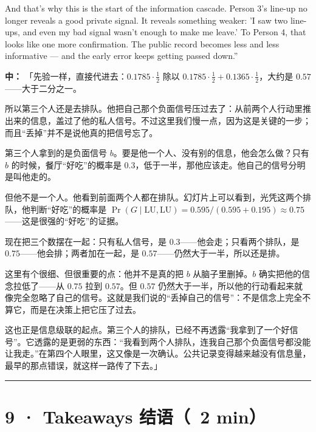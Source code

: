\documentclass[11pt]{article}
\begin{document}
And that's why this is the start of the information cascade. Person 3's line-up no longer reveals a good private signal. It reveals something weaker: 'I saw two line-ups, and even my bad signal wasn't enough to make me leave.' To Person 4, that looks like one more confirmation. The public record becomes less and less informative — and the early error keeps getting passed down.”\par

\textbf{中：} 「先验一样，直接代进去：\(0.1785\cdot\tfrac12\) 除以 \(0.1785\cdot\tfrac12+0.1365\cdot\tfrac12\)，大约是 \(0.57\)——大于二分之一。\par

所以第三个人还是去排队。他把自己那个负面信号压过去了：从前两个人行动里推出来的信息，盖过了他的私人信号。不过这里我们慢一点，因为这是关键的一步；而且“丢掉”并不是说他真的把信号忘了。\par

第三个人拿到的是负面信号 \(b\)。要是他一个人、没有别的信息，他会怎么做？只有 \(b\) 的时候，餐厅“好吃”的概率是 \(0.3\)，低于一半，那他应该走。他自己的信号分明是叫他走的。\par

但他不是一个人。他看到前面两个人都在排队。幻灯片上可以看到，光凭这两个排队，他判断“好吃”的概率是 \(\Pr(G\mid \mathrm{LU},\mathrm{LU})=0.595/(0.595+0.195)\approx 0.75\)——这是很强的“好吃”的证据。\par

现在把三个数摆在一起：只有私人信号，是 \(0.3\)——他会走；只看两个排队，是 \(0.75\)——他会排；两者加在一起，是 \(0.57\)——仍然大于一半，所以还是排。\par

这里有个很细、但很重要的点：他并不是真的把 \(b\) 从脑子里删掉。\(b\) 确实把他的信念拉低了——从 \(0.75\) 拉到 \(0.57\)。但 \(0.57\) 仍然大于一半，所以他的行动看起来就像完全忽略了自己的信号。这就是我们说的“丢掉自己的信号”：不是信念上完全不算它，而是在决策上把它压了过去。\par

这也正是信息级联的起点。第三个人的排队，已经不再透露“我拿到了一个好信号”。它透露的是更弱的东西：“我看到两个人排队，连我自己那个负面信号都没能让我走。”在第四个人眼里，这又像是一次确认。公共记录变得越来越没有信息量，最早的那点错误，就这样一路传了下去。」\par

\vspace{0.35em}\noindent\rule{\textwidth}{0.3pt}\par

\section*{9 · Takeaways 结语（~2 min）}
\end{document}
